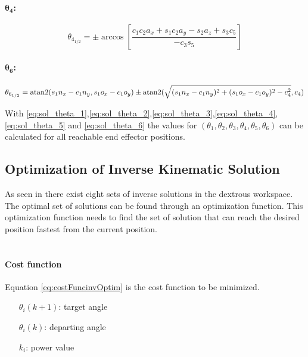 \paragraph{$\pmb{\theta_4}$:}


\begin{equation}\label{eq:sol_theta_4}
	\theta_{4_{1/2}} = \pm \arccos [ \frac{ c_1 c_2 a_x + s_1 c_2 a_y - s_2 a_z + s_3 c_5}{-c_3 s_5}]
\end{equation}

\paragraph{$\pmb{\theta_6}$:}


\begin{equation}\label{eq:sol_theta_6}
	\theta_{6_{1/2}} = \operatorname{atan2}(s_1 n_x -c_1 n_y , s_1 o_x -c_1 o_y) \pm \operatorname{atan2}(\sqrt{(s_1 n_x - c_1 n_y)^2 + (s_1 o_x - c_1 o_y )^2 - c_4^2} , c_4)
\end{equation}

\medskip


With \ref{eq:sol_theta_1},\ref{eq:sol_theta_2},\ref{eq:sol_theta_3},\ref{eq:sol_theta_4},\ref{eq:sol_theta_5} and \ref{eq:sol_theta_6} the values for $(\theta_1, \theta_2, \theta_3, \theta_4, \theta_5, \theta_6)$ can be calculated for all reachable end effector positions.\\

\medskip


\subsection{Optimization of Inverse Kinematic Solution}

As seen in  there exist eight sets of inverse solutions in the dextrous workspace.
The optimal set of solutions can be found through an optimization function. 
This optimization function needs to find the set of solution that can reach the desired position fastest from the current position.\\
\\
\paragraph{Cost function}
Equation \ref{eq:costFuncinvOptim} is the cost function to be minimized.
\begin{itemize}[wide=\parindent] 
	\item[$\theta_i (k+1)$:] target angle
	\item[$\theta_i(k)$:] departing angle
	\item[$k_i$:] power value
\end{itemize}

